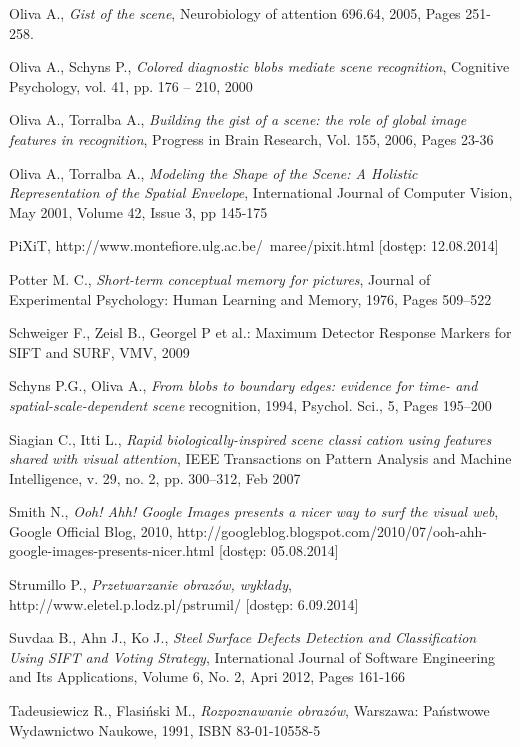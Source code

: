 \begin{thebibliography}{100}
 Oliva A., \emph{Gist of the scene}, Neurobiology of attention 696.64, 2005, Pages 251-258.

 Oliva A., Schyns P., \emph{Colored diagnostic blobs mediate scene recognition}, Cognitive Psychology, vol. 41, pp. 176 – 210, 2000

 Oliva A., Torralba A., \emph{Building the gist of a scene: the role of global image features in recognition}, Progress in Brain Research, Vol. 155, 2006, Pages 23-36

 Oliva A., Torralba A., \emph{Modeling the Shape of the Scene: A Holistic Representation of the Spatial Envelope}, International Journal of Computer Vision, May 2001, Volume 42, Issue 3, pp 145-175

 PiXiT, http://www.montefiore.ulg.ac.be/~maree/pixit.html [dostęp: 12.08.2014]

 Potter M. C., \emph{Short-term conceptual memory for pictures}, Journal of Experimental Psychology: Human Learning and Memory, 1976, Pages 509–522

 Schweiger F., Zeisl B., Georgel P et al.: Maximum Detector Response Markers for SIFT and SURF, VMV, 
2009

 Schyns P.G., Oliva A., \emph{From blobs to boundary edges: evidence for time- and spatial-scale-dependent scene} recognition, 1994, Psychol. Sci., 5, Pages 195–200

 Siagian C., Itti L., \emph{Rapid biologically-inspired scene classi cation using features shared with visual attention}, IEEE Transactions on Pattern Analysis and Machine Intelligence, v. 29, no. 2, pp. 300–312, Feb 2007

 Smith N., \emph{Ooh! Ahh! Google Images presents a nicer way to surf the visual web}, Google Official Blog, 2010, http://googleblog.blogspot.com/2010/07/ooh-ahh-google-images-presents-nicer.html [dostęp: 05.08.2014]

 Strumillo P., \emph{Przetwarzanie obrazów, wykłady}, http://www.eletel.p.lodz.pl/pstrumil/ [dostęp: 6.09.2014]

 Suvdaa B., Ahn J., Ko J., \emph{Steel Surface Defects Detection and Classification Using SIFT and Voting Strategy}, International Journal of Software Engineering and Its Applications, Volume 6, No. 2, Apri 2012, Pages 161-166

 Tadeusiewicz R., Flasiński M., \emph{Rozpoznawanie obrazów}, Warszawa: Państwowe Wydawnictwo Naukowe, 1991, ISBN 83-01-10558-5


\end{thebibliography}

